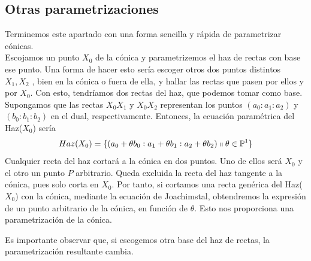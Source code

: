 \subsection{Otras parametrizaciones}
Terminemos este apartado con una forma sencilla y rápida de parametrizar cónicas.\\

Escojamos un punto $X_0$ de la cónica y parametrizemos el haz de rectas con base ese punto. Una forma de hacer esto sería escoger otros dos puntos distintos $X_1,X_2$ , bien en la cónica o fuera de ella, y hallar las rectas que pasen por ellos y por $X_0$. Con esto, tendríamos dos rectas del haz, que podemos tomar como base. Supongamos que las rectas $X_0X_1$ y $X_0X_2$ representan los puntos $(a_0:a_1:a_2)$ y $(b_0:b_1:b_2)$ en el dual, respectivamente. Entonces, la ecuación paramétrica del Haz($X_0$) sería 
\[Haz(X_0)=\{(a_0+\theta b_0:a_1+\theta b_1:a_2+\theta b_2)\shortparallel \theta\in\mathbb{P}^1\}\]
Cualquier recta del haz cortará a la cónica en dos puntos. Uno de ellos será $X_0$ y el otro un punto $P$ arbitrario. Queda excluida la recta del haz tangente a la cónica, pues solo corta en $X_0$. Por tanto, si cortamos una recta genérica del Haz($X_0$) con la cónica, mediante la ecuación de Joachimstal, obtendremos la expresión de un punto arbitrario de la cónica, en función de $\theta$. Esto nos proporciona una parametrización de la cónica.

Es importante observar que, si escogemos otra base del haz de rectas, la parametrización resultante cambia.
